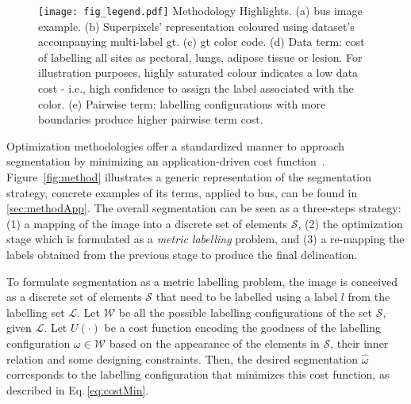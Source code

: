 \begin{figure*}[!htb]
    \caption {
      \protect\texttt{[image: fig\_legend.pdf]}
      \small Methodology Highlights.
      (a) \acs{bus} image example.
      (b) Superpixels' representation coloured using dataset's accompanying multi-label \acs{gt}.
      (c) \ac{gt} color code.
      (d) Data term: cost of labelling all sites as pectoral, lungs, adipose tissue or lesion.
      For illustration purposes, highly saturated colour indicates a low data cost - i.e., high confidence to assign the label associated with the color.
      (e) Pairwise term: labelling configurations with more boundaries produce higher pairwise term cost.}
    \label{fig:methodTerms}
\end{figure*}


Optimization methodologies offer a standardized manner to approach segmentation by minimizing an application-driven cost function~\cite{cremers2007review}.
Figure~\ref{fig:method} illustrates a generic representation of the segmentation strategy,
concrete examples of its terms, applied to \ac{bus}, can be found in \cref{sec:methodApp}.
The overall segmentation can be seen as a three-steps strategy:
(1) a mapping of the image into a discrete set of elements $\mathcal{S}$,
(2) the optimization stage which is formulated as a \emph{metric labelling} problem,
and (3) a re-mapping the labels obtained from the previous stage to produce the final delineation.

% 
%   


To formulate segmentation as a metric labelling problem, the image is conceived as a discrete set of elements $\mathcal{S}$ that need to be labelled using a label $l$ from the labelling set $\mathcal{L}$.
Let $\mathcal{W}$ be all the possible labelling configurations of the set $\mathcal{S}$, given $\mathcal{L}$.
Let $U(\cdot)$ be a cost function encoding the goodness of the labelling configuration $\omega \in \mathcal{W}$ based on the appearance of the elements in $\mathcal{S}$, their inner relation and some designing constraints.
Then, the desired segmentation $\hat{\omega}$ corresponds to the labelling configuration that minimizes this cost function, as described in Eq.\,\eqref{eq:costMin}.

